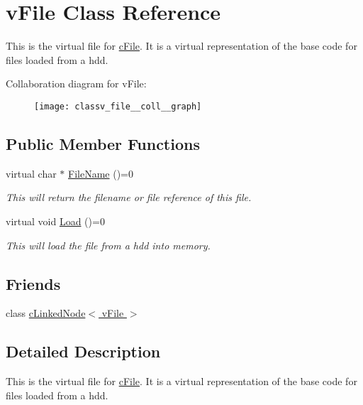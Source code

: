 \hypertarget{classv_file}{
\section{vFile Class Reference}
\label{classv_file}
}


This is the virtual file for \hyperlink{classc_file}{cFile}. It is a virtual representation of the base code for files loaded from a hdd.  




Collaboration diagram for vFile:\nopagebreak
\begin{figure}[H]
\begin{center}
\leavevmode
\texttt{[image: classv\_file\_\_coll\_\_graph]}
\end{center}
\end{figure}
\subsection*{Public Member Functions}
\begin{DoxyCompactItemize}
\item 
\hypertarget{classv_file_a34a809462f9074a0b82a913f3c9bd955}{
virtual char $\ast$ \hyperlink{classv_file_a34a809462f9074a0b82a913f3c9bd955}{FileName} ()=0}
\label{classv_file_a34a809462f9074a0b82a913f3c9bd955}

\begin{DoxyCompactList}\small\item\em This will return the filename or file reference of this file. \end{DoxyCompactList}\item 
\hypertarget{classv_file_a7478cc6459dfe5c11bcf55555f652f3d}{
virtual void \hyperlink{classv_file_a7478cc6459dfe5c11bcf55555f652f3d}{Load} ()=0}
\label{classv_file_a7478cc6459dfe5c11bcf55555f652f3d}

\begin{DoxyCompactList}\small\item\em This will load the file from a hdd into memory. \end{DoxyCompactList}\end{DoxyCompactItemize}
\subsection*{Friends}
\begin{DoxyCompactItemize}
\item 
\hypertarget{classv_file_a2d8d35ceabac08d6b6f01f064bae91a0}{
class \hyperlink{classv_file_a2d8d35ceabac08d6b6f01f064bae91a0}{cLinkedNode$<$ vFile $>$}}
\label{classv_file_a2d8d35ceabac08d6b6f01f064bae91a0}

\end{DoxyCompactItemize}


\subsection{Detailed Description}
This is the virtual file for \hyperlink{classc_file}{cFile}. It is a virtual representation of the base code for files loaded from a hdd. 